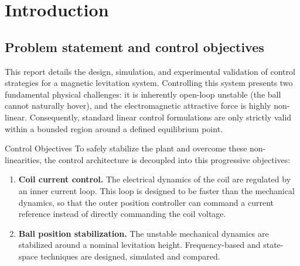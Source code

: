 \section{Introduction}

\subsection{Problem statement and control objectives}
This report details the design, simulation, and experimental validation of control strategies for a magnetic levitation system.
Controlling this system presents two fundamental physical challenges: it is inherently open-loop unstable (the ball cannot naturally hover),
and the electromagnetic attractive force is highly non-linear.
Consequently, standard linear control formulations are only strictly valid within a bounded region around a defined equilibrium point. 

Control Objectives To safely stabilize the plant and overcome these non-linearities, the control architecture is decoupled into this progressive objectives: 

\begin{enumerate}[label=\textbf{O\arabic*.},leftmargin=1.4cm]
    \item \textbf{Coil current control.} The electrical dynamics of the coil are regulated by an inner current loop.
    This loop is designed to be faster than the mechanical dynamics, so that the outer position controller can command a current reference instead of directly commanding the coil voltage.
    \item \textbf{Ball position stabilization.} The unstable mechanical dynamics are stabilized around a nominal levitation height. Frequency-based and state-space techniques are designed, simulated and compared.
\end{enumerate}
